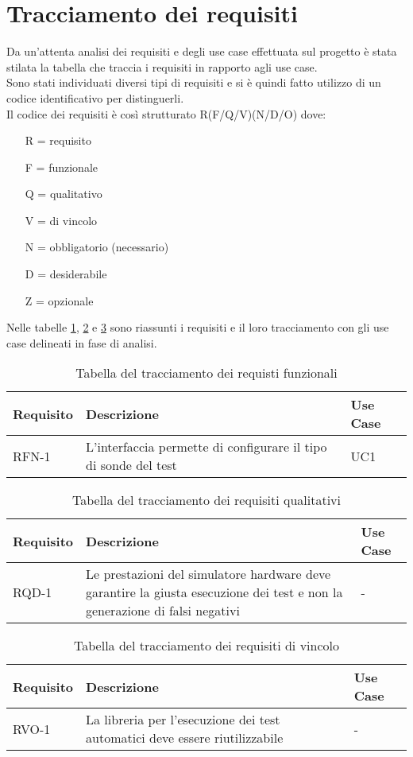 \section{Tracciamento dei requisiti}
Da un'attenta analisi dei requisiti e degli use case effettuata sul progetto è stata stilata la tabella che traccia i requisiti in rapporto agli use case.\\
Sono stati individuati diversi tipi di requisiti e si è quindi fatto utilizzo di un codice identificativo per distinguerli.\\
Il codice dei requisiti è così strutturato R(F/Q/V)(N/D/O) dove:
\begin{enumerate}[nolistsep]
	\item[R =] requisito
    \item[F =] funzionale
    \item[Q =] qualitativo
    \item[V =] di vincolo
    \item[N =] obbligatorio (necessario)
    \item[D =] desiderabile
    \item[Z =] opzionale
\end{enumerate}
Nelle tabelle \ref{tab:requisiti-funzionali}, \ref{tab:requisiti-qualitativi} e \ref{tab:requisiti-vincolo} sono riassunti i requisiti e il loro tracciamento con gli use case delineati in fase di analisi.
\begin{table}[H]%
\caption{Tabella del tracciamento dei requisti funzionali}
\label{tab:requisiti-funzionali}
\begin{tabularx}{\textwidth}{lXl}
\hline\hline
\textbf{Requisito} & \textbf{Descrizione} & \textbf{Use Case}\\
\hline
RFN-1     & L'interfaccia permette di configurare il tipo di sonde del test & UC1 \\
\hline
\end{tabularx}
\end{table}%

\begin{table}[H]%
\caption{Tabella del tracciamento dei requisiti qualitativi}
\label{tab:requisiti-qualitativi}
\begin{tabularx}{\textwidth}{lXl}
\hline\hline
\textbf{Requisito} & \textbf{Descrizione} & \textbf{Use Case}\\
\hline
RQD-1    & Le prestazioni del simulatore hardware deve garantire la giusta esecuzione dei test e non la generazione di falsi negativi & - \\
\hline
\end{tabularx}
\end{table}%

\begin{table}[H]%
\caption{Tabella del tracciamento dei requisiti di vincolo}
\label{tab:requisiti-vincolo}
\begin{tabularx}{\textwidth}{lXl}
\hline\hline
\textbf{Requisito} & \textbf{Descrizione} & \textbf{Use Case}\\
\hline
RVO-1    & La libreria per l'esecuzione dei test automatici deve essere riutilizzabile & - \\
\hline
\end{tabularx}
\end{table}%